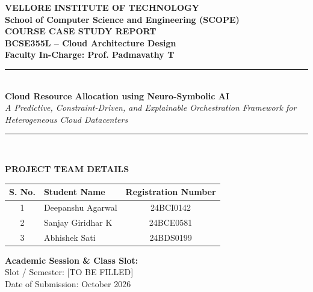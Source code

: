 \documentclass[conference]{IEEEtran}
\begin{document}
\begin{titlepage}
\onecolumn
\centering
\vspace*{1.5cm}

{\Huge \textbf{VELLORE INSTITUTE OF TECHNOLOGY}}\\[0.4cm]
{\Large \textbf{School of Computer Science and Engineering (SCOPE)}}\\[1.5cm]

{\LARGE \textbf{COURSE CASE STUDY REPORT}}\\[0.8cm]
{\Large \textbf{BCSE355L -- Cloud Architecture Design}}\\[0.4cm]
{\large \textbf{Faculty In-Charge: Prof. Padmavathy T}}\\[1.8cm]

\rule{\linewidth}{1.2pt}\\[0.5cm]
{\huge \textbf{Cloud Resource Allocation using Neuro-Symbolic AI}}\\[0.2cm]
{\large \textit{A Predictive, Constraint-Driven, and Explainable Orchestration Framework for Heterogeneous Cloud Datacenters}}\\[0.4cm]
\rule{\linewidth}{1.2pt}\\[2.0cm]

\begin{minipage}{0.85\textwidth}
\centering
\large
\textbf{PROJECT TEAM DETAILS}\\[0.4cm]
\begin{tabular}{|c|l|c|}
\hline
\textbf{S. No.} & \textbf{Student Name} & \textbf{Registration Number} \\
\hline
1 & Deepanshu Agarwal & 24BCI0142 \\
2 & Sanjay Giridhar K & 24BCE0581 \\
3 & Abhishek Sati & 24BDS0199 \\
\hline
\end{tabular}
\end{minipage}

\vfill

\begin{minipage}{0.85\textwidth}
\centering
\large
\textbf{Academic Session \& Class Slot:}\\[0.2cm]
Slot / Semester: [TO BE FILLED] \\[0.2cm]
Date of Submission: October 2026
\end{minipage}

\vspace*{1.5cm}
\end{titlepage}
\end{document}
